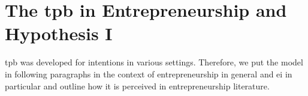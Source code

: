 \section{The \acl{tpb} in Entrepreneurship and Hypothesis I}
\label{sec:tpb-literature}
\ac{tpb} was developed for intentions in various settings. Therefore, we put the model in following paragraphs in the context of entrepreneurship in general and \ac{ei} in particular and outline how it is perceived in entrepreneurship literature.
%
%


